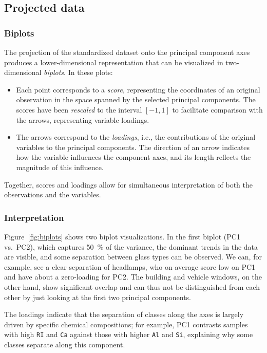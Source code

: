 \documentclass[dtu]{dtuarticle}
\begin{document}
	\subsection{Projected data}

	\subsubsection{Biplots}

	The projection of the standardized dataset onto the principal component axes produces a lower-dimensional representation that can be visualized in two-dimensional \textit{biplots}. In these plots:

	\begin{itemize}
		\item Each point corresponds to a \textit{score}, representing the coordinates of an original observation in the space spanned by the selected principal components. The scores have been \textit{rescaled} to the interval $[-1,1]$ to facilitate comparison with the arrows, representing variable loadings.
		\item The arrows correspond to the \textit{loadings}, i.e., the contributions of the original variables to the principal components. The direction of an arrow indicates how the variable influences the component axes, and its length reflects the magnitude of this influence.
	\end{itemize}

	Together, scores and loadings allow for simultaneous interpretation of both the observations and the variables.

	\subsubsection{Interpretation}

	Figure~\ref{fig:biplots} shows two biplot visualizations. In the first biplot (PC1 vs.\ PC2), which captures \SI{50}{\percent} of the variance, the dominant trends in the data are visible, and some separation between glass types can be observed. We can, for example, see a clear separation of headlamps, who on average score low on PC1 and have about a zero-loading for PC2. The building and vehicle windows, on the other hand, show significant overlap and can thus not be distinguished from each other by just looking at the first two principal components.

	The loadings indicate that the separation of classes along the axes is largely driven by specific chemical compositions; for example, PC1 contrasts samples with high \texttt{RI} and \texttt{Ca} against those with higher \texttt{Al} and \texttt{Si}, explaining why some classes separate along this component.
\end{document}

